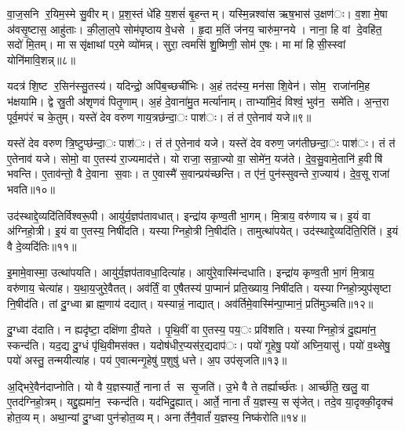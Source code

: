 वा॒ज॒सनि र॒यिम॒स्मे सु॒वीरम्। प्र॒श॒स्तं धे॑हि य॒शसं॑ बृ॒हन्तम्। यस्मि॒न्नश्वा॑स ऋष॒भास॑ उ॒क्षण॑ः। व॒शा मे॒षा अ॑वसृ॒ष्टास॒ आहु॑ताः। की॒ला॒ल॒पे सोम॑पृष्ठाय वे॒धसे। हृ॒दा म॒तिं ज॑नय॒ चारु॑म॒ग्नये। नाना॒ हि वां दे॒वहि॑त॒ सदो॑ मि॒तम्। मा ससृ॑क्षाथां पर॒मे व्यो॑मन्न्। सुरा॒ त्वमसि॑ शु॒ष्मिणी॒ सोम॑ ए॒षः। मा मा॑ हिसी॒स्स्वां योनि॑मावि॒शन्न्॥८॥

यदत्र॑ शि॒ष्ट र॒सिन॑स्सु॒तस्य॑। यदिन्द्रो॒ अपि॑ब॒च्छची॑भिः। अ॒हं तद॑स्य॒ मन॑सा शि॒वेन॑। सोम॒ राजा॑नमि॒ह भ॑क्षयामि। द्वे स्रु॒ती अ॑शृणवं पितृ॒णाम्। अ॒हं दे॒वाना॑मु॒त मर्त्या॑नाम्। ताभ्या॑मि॒दं विश्वं॒ भुव॑न॒ समे॑ति। अ॒न्त॒रा पूर्व॒मप॑रं च के॒तुम्। यस्ते॑ देव वरुण गाय॒त्रछ॑न्दा॒ः पाश॑ः। तं त॑ ए॒तेनाव॑ यजे॥९॥

यस्ते॑ देव वरुण त्रि॒ष्टुप्छ॑न्दा॒ः पाश॑ः। तं त॑ ए॒तेनाव॑ यजे। यस्ते॑ देव वरुण॒ जग॑तीछन्दा॒ः पाश॑ः। तं त॑ ए॒तेनाव॑ यजे। सोमो॒ वा ए॒तस्य॑ रा॒ज्यमाद॑त्ते। यो राजा॒ सन्रा॒ज्यो वा॒ सोमे॑न॒ यज॑ते। दे॒व॒सु॒वामे॒तानि॑ ह॒वीषि॑ भवन्ति। ए॒ताव॑न्तो॒ वै दे॒वाना स॒वाः। त ए॒वास्मै॑ स॒वान्प्रय॑च्छन्ति। त ए॑नं॒ पुन॑स्सुवन्ते रा॒ज्याय॑। दे॒व॒सू राजा॑ भवति॥१०॥


उद॑स्थाद्दे॒व्यदि॑तिर्विश्वरू॒पी। आयु॑र्य॒ज्ञप॑तावधात्। इन्द्रा॑य कृण्व॒ती भा॒गम्। मि॒त्राय॒ वरु॑णाय च। इ॒यं वा अ॑ग्निहो॒त्री। इ॒यं वा ए॒तस्य॒ निषी॑दति। यस्याग्निहो॒त्री नि॒षीद॑ति। तामुत्था॑पयेत्। उद॑स्थाद्दे॒व्यदि॑ति॒रिति॑। इ॒यं वै दे॒व्यदि॑तिः॥११॥

इ॒मामे॒वास्मा॒ उत्था॑पयति। आयु॑र्य॒ज्ञप॑तावधा॒दित्या॑ह। आयु॑रे॒वास्मि॑न्दधाति। इन्द्रा॑य कृण्व॒ती भा॒गं मि॒त्राय॒ वरु॑णाय॒ चेत्या॑ह। य॒था॒य॒जुरे॒वैतत्। अव॑र्तिं॒ वा ए॒षैतस्य॑ पा॒प्मानं॑ प्रति॒ख्याय॒ निषी॑दति। यस्याग्निहो॒त्र्युप॑सृष्टा नि॒षीद॑ति। तां दु॒ग्ध्वा ब्राह्म॒णाय॑ दद्यात्। यस्यान्नं॒ नाद्यात्। अव॑र्तिमे॒वास्मि॑न्पा॒प्मानं॒ प्रति॑मुञ्चति॥१२॥

दु॒ग्ध्वा द॑दाति। न ह्यदृ॑ष्टा॒ दक्षि॑णा दी॒यते। पृ॒थि॒वीं वा ए॒तस्य॒ पय॒ः प्रवि॑शति। यस्याग्निहो॒त्रं दु॒ह्यमा॑न॒ स्कन्द॑ति। यद॒द्य दु॒ग्धं पृ॑थि॒वीमस॑क्त। यदोष॑धीर॒प्यस॑र॒द्यदाप॑ः। पयो॑ गृ॒हेषु॒ पयो॑ अघ्नि॒यासु॑। पयो॑ व॒थ्सेषु॒ पयो॑ अस्तु॒ तन्मयीत्या॑ह। पय॑ ए॒वात्मन्गृ॒हेषु॑ प॒शुषु॑ धत्ते। अ॒प उप॑सृजति॥१३॥

अ॒द्भिरे॒वैन॑दाप्नोति। यो वै य॒ज्ञस्यार्ते॒ नानार्त स सृ॒जति॑। उ॒भे वै ते तर्ह्यार्च्छ॑तः। आर्च्छ॑ति॒ खलु॒ वा ए॒तद॑ग्निहो॒त्रम्। यद्दु॒ह्यमा॑न॒ स्कन्द॑ति। यद॑भिदु॒ह्यात्। आर्ते॒ नानार्तं य॒ज्ञस्य॒ ससृ॑जेत्। तदे॒व या॒दृक्की॒दृक्च॑ होत॒व्यम्। अथा॒न्यां दु॒ग्ध्वा पुन॑ऱ्होत॒व्यम्। अनार्तेनै॒वार्तं॑ य॒ज्ञस्य॒ निष्क॑रोति॥१४॥

